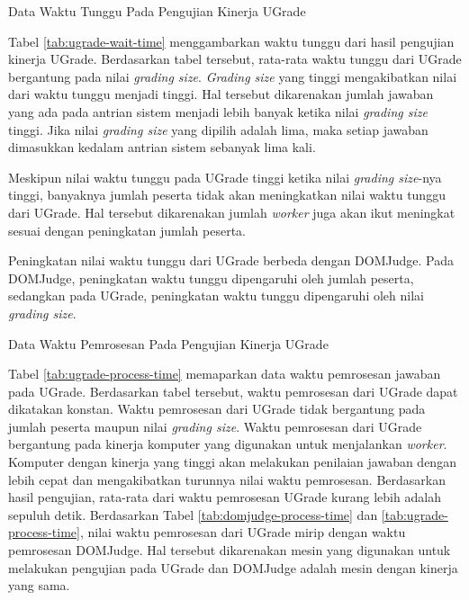 \begin{table}[ht!]
    \centering
    
    \caption{Data Waktu Tunggu Pada Pengujian Kinerja UGrade}
    \label{tab:ugrade-wait-time}
\end{table}

\par Tabel \ref{tab:ugrade-wait-time} menggambarkan waktu tunggu dari hasil pengujian kinerja UGrade. Berdasarkan tabel tersebut, rata-rata waktu tunggu dari UGrade bergantung pada nilai \textit{grading size}. \textit{Grading size} yang tinggi mengakibatkan nilai dari waktu tunggu menjadi tinggi. Hal tersebut dikarenakan jumlah jawaban yang ada pada antrian sistem menjadi lebih banyak ketika nilai \textit{grading size} tinggi. Jika nilai \textit{grading size} yang dipilih adalah lima, maka setiap jawaban dimasukkan kedalam antrian sistem sebanyak lima kali.

\par Meskipun nilai waktu tunggu pada UGrade tinggi ketika nilai \textit{grading size}-nya tinggi, banyaknya jumlah peserta tidak akan meningkatkan nilai waktu tunggu dari UGrade. Hal tersebut dikarenakan jumlah \textit{worker} juga akan ikut meningkat sesuai dengan peningkatan jumlah peserta.

\par Peningkatan nilai waktu tunggu dari UGrade berbeda dengan DOMJudge. Pada DOMJudge, peningkatan waktu tunggu dipengaruhi oleh jumlah peserta, sedangkan pada UGrade, peningkatan waktu tunggu dipengaruhi oleh nilai \textit{grading size}.

\begin{table}[ht!]
    \centering
    
    \caption{Data Waktu Pemrosesan Pada Pengujian Kinerja UGrade}
    \label{tab:ugrade-process-time}
\end{table}

\par Tabel \ref{tab:ugrade-process-time} memaparkan data waktu pemrosesan jawaban pada UGrade. Berdasarkan tabel tersebut, waktu pemrosesan dari UGrade dapat dikatakan konstan. Waktu pemrosesan dari UGrade tidak bergantung pada jumlah peserta maupun nilai \textit{grading size}. Waktu pemrosesan dari UGrade bergantung pada kinerja komputer yang digunakan untuk menjalankan \textit{worker}. Komputer dengan kinerja yang tinggi akan melakukan penilaian jawaban dengan lebih cepat dan mengakibatkan turunnya nilai waktu pemrosesan. Berdasarkan hasil pengujian, rata-rata dari waktu pemrosesan UGrade kurang lebih adalah sepuluh detik. Berdasarkan Tabel \ref{tab:domjudge-process-time} dan \ref{tab:ugrade-process-time}, nilai waktu pemrosesan dari UGrade mirip dengan waktu pemrosesan DOMJudge. Hal tersebut dikarenakan mesin yang digunakan untuk melakukan pengujian pada UGrade dan DOMJudge adalah mesin dengan kinerja yang sama.

